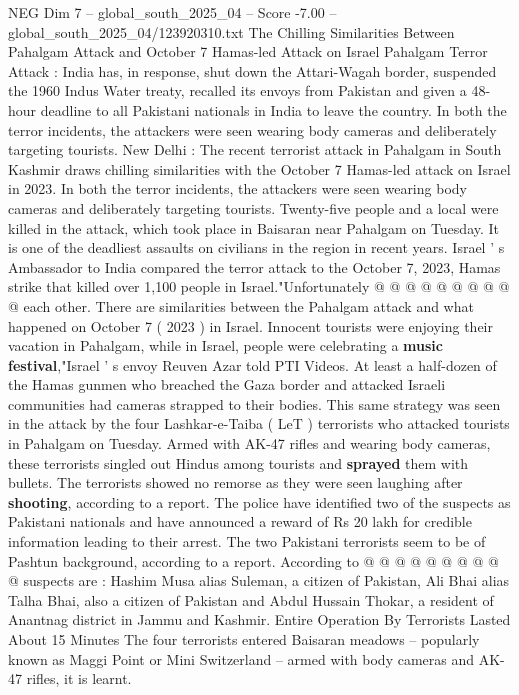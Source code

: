 \begin{textsample}{NEG Dim 7 – global\_south\_2025\_04 – Score -7.00 – global\_south\_2025\_04/123920310.txt}  \label{ex:f7_neg_302}
The Chilling Similarities Between Pahalgam Attack and October 7 Hamas-led Attack on Israel Pahalgam Terror Attack : India has, in response, shut down the Attari-Wagah border, suspended the 1960 Indus Water treaty, recalled its envoys from Pakistan and given a 48-hour deadline to all Pakistani nationals in India to leave the country.
In both the terror incidents, the attackers were seen wearing body cameras and deliberately targeting tourists.
New Delhi : The recent terrorist attack in Pahalgam in South Kashmir draws chilling similarities with the October 7 Hamas-led attack on Israel in 2023.
In both the terror incidents, the attackers were seen wearing body cameras and deliberately targeting tourists.
Twenty-five people and a local were killed in the attack, which took place in Baisaran near Pahalgam on Tuesday.
It is one of the deadliest assaults on civilians in the region in recent years.
Israel ' s Ambassador to India compared the terror attack to the October 7, 2023, Hamas strike that killed over 1,100 people in Israel."Unfortunately @ @ @ @ @ @ @ @ @ @ each other.
There are similarities between the Pahalgam attack and what happened on October 7 ( 2023 ) in Israel.
Innocent tourists were enjoying their vacation in Pahalgam, while in Israel, people were celebrating a \textbf{music} \textbf{festival},"Israel ' s envoy Reuven Azar told PTI Videos.
At least a half-dozen of the Hamas gunmen who breached the Gaza border and attacked Israeli communities had cameras strapped to their bodies.
This same strategy was seen in the attack by the four Lashkar-e-Taiba ( LeT ) terrorists who attacked tourists in Pahalgam on Tuesday.
Armed with AK-47 rifles and wearing body cameras, these terrorists singled out Hindus among tourists and \textbf{sprayed} them with bullets.
The terrorists showed no remorse as they were seen laughing after \textbf{shooting}, according to a report.
The police have identified two of the suspects as Pakistani nationals and have announced a reward of Rs 20 lakh for credible information leading to their arrest.
The two Pakistani terrorists seem to be of Pashtun background, according to a report.
According to @ @ @ @ @ @ @ @ @ @ suspects are : Hashim Musa alias Suleman, a citizen of Pakistan, Ali Bhai alias Talha Bhai, also a citizen of Pakistan and Abdul Hussain Thokar, a resident of Anantnag district in Jammu and Kashmir.
Entire Operation By Terrorists Lasted About 15 Minutes The four terrorists entered Baisaran meadows -- popularly known as Maggi Point or Mini Switzerland -- armed with body cameras and AK-47 rifles, it is learnt.

\end{textsample}
